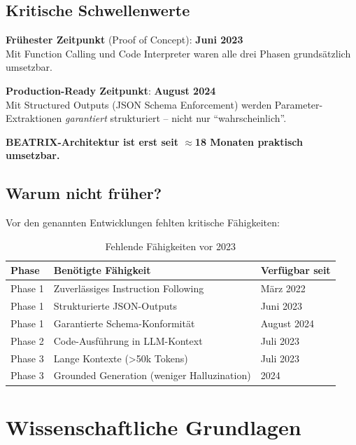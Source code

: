 \documentclass[12pt,a4paper]{article}
\begin{document}
\subsection{Kritische Schwellenwerte}

\begin{tcolorbox}[colback=yellow!5!white, colframe=yellow!75!black, title=Zeitliche Einordnung]
\textbf{Frühester Zeitpunkt} (Proof of Concept): \textbf{Juni 2023}\\
Mit Function Calling und Code Interpreter waren alle drei Phasen grundsätzlich umsetzbar.

\textbf{Production-Ready Zeitpunkt}: \textbf{August 2024}\\
Mit Structured Outputs (JSON Schema Enforcement) werden Parameter-Extraktionen \textit{garantiert} strukturiert -- nicht nur ``wahrscheinlich''.

\textbf{BEATRIX-Architektur ist erst seit $\approx$18 Monaten praktisch umsetzbar.}
\end{tcolorbox}

\subsection{Warum nicht früher?}

Vor den genannten Entwicklungen fehlten kritische Fähigkeiten:

\begin{table}[h]
\centering
\caption{Fehlende Fähigkeiten vor 2023}
\begin{tabular}{@{}lll@{}}
\toprule
\textbf{Phase} & \textbf{Benötigte Fähigkeit} & \textbf{Verfügbar seit} \\
\midrule
Phase 1 & Zuverlässiges Instruction Following & März 2022 \\
Phase 1 & Strukturierte JSON-Outputs & Juni 2023 \\
Phase 1 & Garantierte Schema-Konformität & August 2024 \\
Phase 2 & Code-Ausführung in LLM-Kontext & Juli 2023 \\
Phase 3 & Lange Kontexte (>50k Tokens) & Juli 2023 \\
Phase 3 & Grounded Generation (weniger Halluzination) & 2024 \\
\bottomrule
\end{tabular}
\end{table}

\section{Wissenschaftliche Grundlagen}
\end{document}
